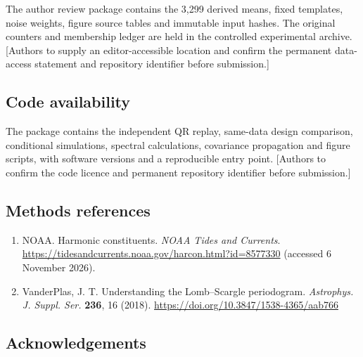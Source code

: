 \documentclass[
  12pt,
  a4paper,
]{article}
\providecommand{\tightlist}{%
  \setlength{\itemsep}{0pt}\setlength{\parskip}{0pt}}
\begin{document}
The author review package contains the 3,299 derived means, fixed
templates, noise weights, figure source tables and immutable input
hashes. The original counters and membership ledger are held in the
controlled experimental archive. {[}Authors to supply an
editor-accessible location and confirm the permanent data-access
statement and repository identifier before submission.{]}

\singlespacing\fontsize{11}{13}\selectfont

\hypertarget{code-availability}{%
\subsection{Code availability}\label{code-availability}}

The package contains the independent QR replay, same-data design
comparison, conditional simulations, spectral calculations, covariance
propagation and figure scripts, with software versions and a
reproducible entry point. {[}Authors to confirm the code licence and
permanent repository identifier before submission.{]}

\singlespacing\fontsize{11}{13}\selectfont

\hypertarget{methods-references}{%
\subsection{Methods references}\label{methods-references}}

\begin{enumerate}
\def\labelenumi{\arabic{enumi}.}
\setcounter{enumi}{21}
\tightlist
\item
  NOAA. Harmonic constituents. \emph{NOAA Tides and Currents}.
  \url{https://tidesandcurrents.noaa.gov/harcon.html?id=8577330}
  (accessed 6 November 2026).
\item
  VanderPlas, J. T. Understanding the Lomb--Scargle periodogram.
  \emph{Astrophys. J. Suppl. Ser.} \textbf{236}, 16 (2018).
  \url{https://doi.org/10.3847/1538-4365/aab766}
\end{enumerate}

\clearpage

\singlespacing\fontsize{11}{13}\selectfont

\hypertarget{acknowledgements}{%
\subsection{Acknowledgements}\label{acknowledgements}}
\end{document}
